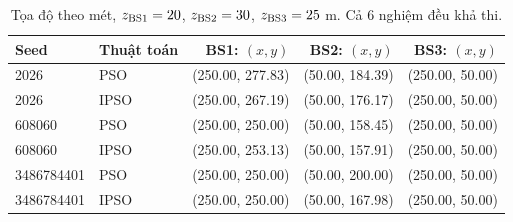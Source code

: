 \begin{table}
\centering
\renewcommand{\arraystretch}{1.16}
\setlength{\tabcolsep}{5pt}
\begin{tabular}{llrrr}
\toprule
Seed & Thuật toán & BS1: $(x,y)$ & BS2: $(x,y)$ & BS3: $(x,y)$ \\
\midrule
2026 & PSO & (250.00, 277.83) & (50.00, 184.39) & (250.00, 50.00) \\
2026 & IPSO & (250.00, 267.19) & (50.00, 176.17) & (250.00, 50.00) \\
608060 & PSO & (250.00, 250.00) & (50.00, 158.45) & (250.00, 50.00) \\
608060 & IPSO & (250.00, 253.13) & (50.00, 157.91) & (250.00, 50.00) \\
3486784401 & PSO & (250.00, 250.00) & (50.00, 200.00) & (250.00, 50.00) \\
3486784401 & IPSO & (250.00, 250.00) & (50.00, 167.98) & (250.00, 50.00) \\
\bottomrule
\end{tabular}
\caption{Tọa độ theo mét, $z_{\rm BS1}=20$, $z_{\rm BS2}=30$, $z_{\rm BS3}=25$ m. Cả 6 nghiệm đều khả thi.}
\end{table}
